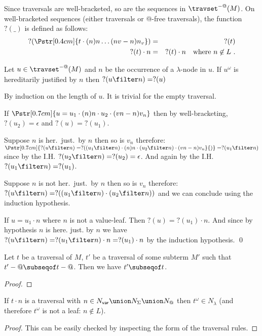Since traversals are well-bracketed, so are the sequences in
$\travset^{-@}(M)$. On well-bracketed sequences (either traversals
or @-free traversals), the function $?(\_)$ is defined as follows:
\begin{eqnarray*}
  ?(\Pstr[0.4cm]{t \cdot (n){n} \ldots (nv-n){n_v} }  ) &=& ?(t) \\
    ?(t) \cdot n &=& ?(t)\cdot n    \quad \mbox{where $n\not\in L$} \ .
\end{eqnarray*}

\begin{lemma}
  Let $u \in \travset^{-@}(M)$ and $n$ be the occurrence of a $\lambda$-node in $u$. If $u^\omega$ is hereditarily justified by $n$ then $?(u\filter n) = ?(u)$
\end{lemma}
\proof
  By induction on the length of $u$. It is trivial for the empty traversal.
  \begin{compactitem}
  \item If $\Pstr[0.7cm]{u = u_1 \cdot (n){n} \cdot u_2 \cdot (vn-n){v_n}}$ then by well-bracketing, $?(u_2) = \epsilon$
  and $?(u) = ?(u_1)$.

  Suppose $n$ is her.\ just.\  by $n$ then so is $v_n$ therefore:
  $\Pstr[0.7cm]{{?(u\filter n)} = ?{((u_1\filter n)} \cdot (n){n} \cdot {(u_2\filter n)} \cdot (vn-n){v_n}}{)}
   = ?(u_1\filter n)$ since by the I.H. $?(u_2\filter n) = ?(u_2) = \epsilon$.
   And again by the I.H. $?(u_1\filter n) = ?(u_1)$.

  Suppose $n$ is not her.\ just.\  by $n$ then so is $v_n$ therefore:
  $?(u\filter n) = ?((u_1\filter n) \cdot (u_2\filter n))$ and we can conclude using the induction hypothesis.

  \item If $u = u_1 \cdot n$ where $n$ is not a value-leaf. Then $?(u) = ?(u_1) \cdot n$.
  And since by hypothesis $n$ is here. just. by $n$ we have
  $?(u \filter n) = ?(u_1\filter n ) \cdot n = ?(u_1) \cdot n$ by the induction hypothesis. \qed
  \end{compactitem}

\begin{lemma}
Let $t$ be a traversal of $M$, $t'$ be a traversal of some subterm
$M'$ such that $t'-@ \subseqof t-@$. Then we have $t'\subseqof t$.
\end{lemma}
\begin{proof}

\end{proof}

\begin{lemma}
\label{lem:trav_last_not_leaf} If $t \cdot n $ is a traversal with
$n \in N_{\sf var} \union N_\Sigma \union N_@$ then $t^\omega \in
N_\lambda$ (and therefore  $t^\omega$ is not a leaf: $n\not\in L$).
\end{lemma}
\begin{proof}
This can be easily checked by inspecting the form of the traversal
rules.
\end{proof}

